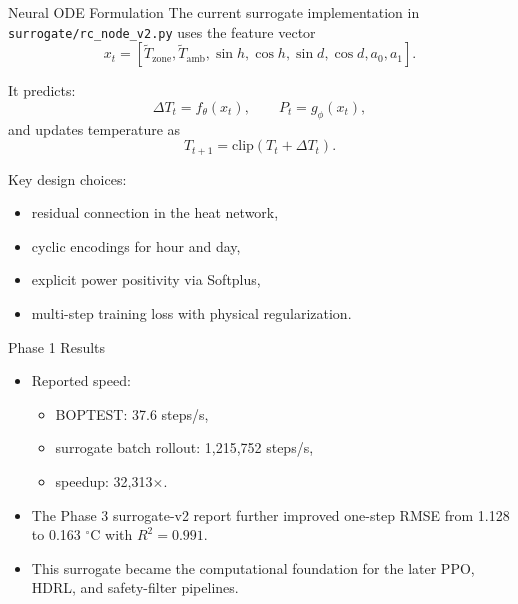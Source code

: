 \documentclass[aspectratio=169,11pt]{beamer}
\newcommand{\degc}{\ensuremath{^\circ\mathrm{C}}}
\begin{document}
\begin{frame}{Neural ODE Formulation}
  The current surrogate implementation in \texttt{surrogate/rc\_node\_v2.py} uses the feature vector
  \[
    x_t = [\tilde T_{\mathrm{zone}}, \tilde T_{\mathrm{amb}}, \sin h, \cos h, \sin d, \cos d, a_0, a_1].
  \]

  \vspace{0.5em}
  It predicts:
  \[
    \Delta T_t = f_\theta(x_t), \qquad P_t = g_\phi(x_t),
  \]
  and updates temperature as
  \[
    T_{t+1} = \mathrm{clip}(T_t + \Delta T_t).
  \]

  \vspace{0.5em}
  Key design choices:
  \begin{itemize}
    \item residual connection in the heat network,
    \item cyclic encodings for hour and day,
    \item explicit power positivity via Softplus,
    \item multi-step training loss with physical regularization.
  \end{itemize}
\end{frame}

\begin{frame}{Phase 1 Results}
  \begin{itemize}
    \item Reported speed:
    \begin{itemize}
      \item BOPTEST: 37.6 steps/s,
      \item surrogate batch rollout: 1,215,752 steps/s,
      \item speedup: 32,313$\times$.
    \end{itemize}
    \item The Phase 3 surrogate-v2 report further improved one-step RMSE from 1.128 to 0.163 \degc{} with $R^2 = 0.991$.
    \item This surrogate became the computational foundation for the later PPO, HDRL, and safety-filter pipelines.
  \end{itemize}
\end{frame}
\end{document}
